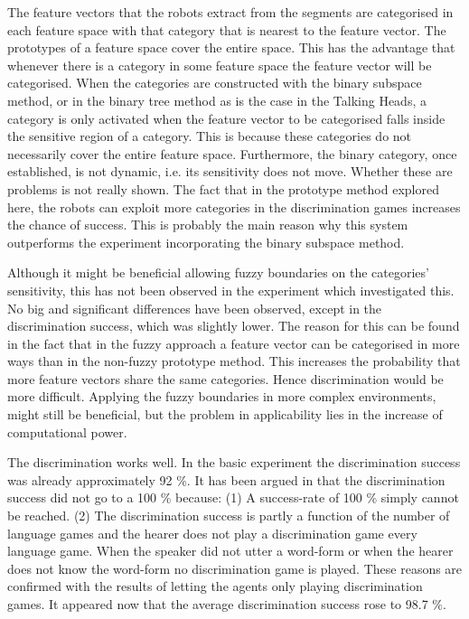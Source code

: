 The feature vectors that the robots extract from the segments are categorised in each feature space with that category that is nearest to the feature vector. The prototypes of a feature space cover the entire space. This has the advantage that whenever there is a category in some feature space the feature vector will be categorised. When the categories are constructed with the binary subspace method, or in the binary tree method \citep{steels:1996b} as is the case in the Talking Heads, a category is only activated when the feature vector to be categorised falls inside the sensitive region of a category. This is because these categories do not necessarily cover the entire feature space. Furthermore, the binary category, once established, is not dynamic, i.e. its sensitivity does not move. Whether these are problems is not really shown. The fact that in the prototype method explored here, the robots can exploit more categories in the discrimination games increases the chance of success. This is probably the main reason why this system outperforms the experiment incorporating the binary subspace method.

Although it might be beneficial allowing fuzzy boundaries on the categories' sensitivity, this has not been observed in the experiment which investigated this. No big and significant differences have been observed, except in the discrimination success, which was slightly lower. The reason for this can be found in the fact that in the fuzzy approach a feature vector can be categorised in more ways than in the non-fuzzy prototype method. This increases the probability that more feature vectors share the same categories. Hence discrimination would be more difficult. Applying the fuzzy boundaries in more complex environments, might still be beneficial, but the problem in applicability lies in the increase of computational power.


The discrimination works well. In the basic experiment the discrimination success was already approximately 92 \%. It has been argued in  that the discrimination success did not go to a 100 \% because: (1) A success-rate of 100 \% simply cannot be reached. (2) The discrimination success is partly a function of the number of language games and the hearer does not play a discrimination game every language game. When the speaker did not utter a word-form or when the hearer does not know the word-form no discrimination game is played. These reasons are confirmed with the results of letting the agents only playing discrimination games. It appeared now that the average discrimination success rose to 98.7 \%.

